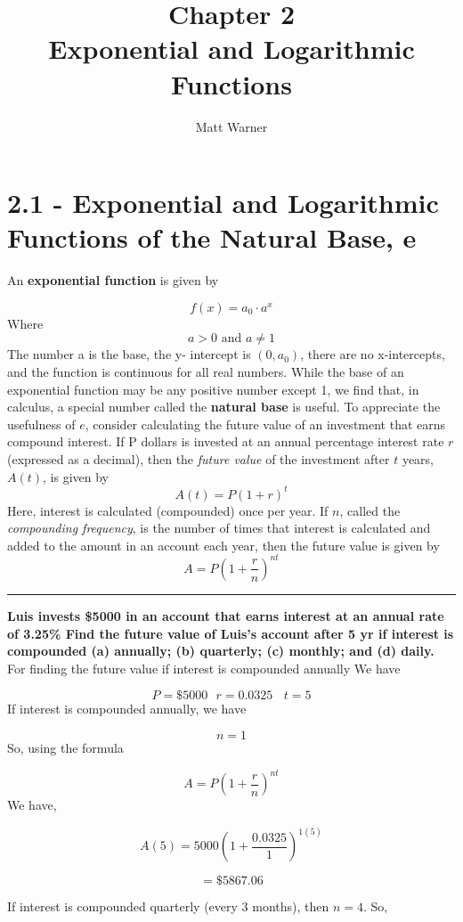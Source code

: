 \documentclass{report}
\title{\Huge{Chapter 2  \\ Exponential and Logarithmic Functions }}
\author{\huge{Matt Warner}}
\date{\huge{}}
\begin{document}
  \maketitle
  \section*{2.1 - Exponential and Logarithmic Functions of the Natural Base, e} 
 \bigbreak \noindent 
 An \textbf{exponential function} is given by

 $$ f(x) = a_0 \cdot a^x$$
 Where 
\bigbreak \noindent
 $$ a > 0 \text{ and } a \neq 1$$
\bigbreak \noindent
 The number a is the base, the y- intercept is $(0, a_0)$, there are no x-intercepts, and the function is continuous for all real numbers.
 \bigbreak \noindent
 While the base of an exponential function may be any positive number except 1, we find that, in calculus, a special number called the \textbf{natural base} is useful.
 \bigbreak \noindent
 To appreciate the usefulness of $e$, consider calculating the future value of an investment that earns compound interest. If P dollars is invested at an annual percentage interest rate $r$ (expressed as a decimal), then the \textit{future value} of the investment after $t$ years, $A(t)$, is given by
 $$ A(t) = P(1 + r )^t$$
 Here, interest is calculated (compounded) once per year. If $n$, called the \textit{compounding frequency}, is the number of times that interest is calculated and added to the amount in an account each year, then the future value is given by
 $$ A = P(1 +\dfrac{r}{n})^{nt}$$
 \bigbreak \noindent
 \hrule
 \bigbreak \noindent
 \q
 \bigbreak \noindent
 \textbf{Luis invests \$5000 in an account that earns interest at an annual rate of 3.25\% Find the future value of Luis's account after 5 yr if interest is compounded (a) annually; (b) quarterly; (c) monthly; and (d) daily.}
  \bigbreak \noindent
  For finding the future value if interest is compounded annually
  \bigbreak \noindent
  We have

  $$ P = \$5000 \ \ \ r = 0.0325 \ \ \ \ t = 5$$
  \bigbreak \noindent
  If interest is compounded annually, we have

  $$ n = 1$$
  \bigbreak \noindent
  So, using the formula

  $$ A = P\left(1 + \dfrac{r}{n}\right)^{nt}$$
  We have, 
  
  $$ A(5) = 5000\left(1 + \dfrac{0.0325}{1}\right)^{ 1(5)}$$

  $$ = \$5867.06$$

  \pagebreak
  \noindent If interest is compounded quarterly (every 3 months), then $n = 4$.
  \bigbreak \noindent
  So,
  
\end{document}

